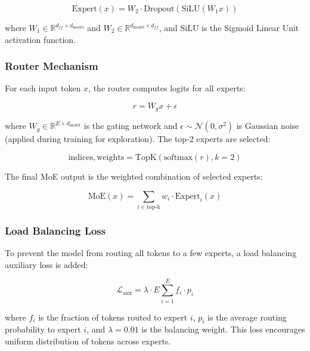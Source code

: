 \documentclass[11pt,a4paper]{article}
\begin{document}
\begin{equation}
\text{Expert}(x) = W_2 \cdot \text{Dropout}(\text{SiLU}(W_1 x))
\end{equation}

where $W_1 \in \mathbb{R}^{d_{ff} \times d_{\text{model}}}$ and $W_2 \in \mathbb{R}^{d_{\text{model}} \times d_{ff}}$, and SiLU is the Sigmoid Linear Unit activation function.

\subsubsection{Router Mechanism}

For each input token $x$, the router computes logits for all experts:

\begin{equation}
r = W_g x + \epsilon
\end{equation}

where $W_g \in \mathbb{R}^{E \times d_{\text{model}}}$ is the gating network and $\epsilon \sim \mathcal{N}(0, \sigma^2)$ is Gaussian noise (applied during training for exploration). The top-2 experts are selected:

\begin{equation}
\text{indices}, \text{weights} = \text{TopK}(\text{softmax}(r), k=2)
\end{equation}

The final MoE output is the weighted combination of selected experts:

\begin{equation}
\text{MoE}(x) = \sum_{i \in \text{top-k}} w_i \cdot \text{Expert}_i(x)
\end{equation}

\subsubsection{Load Balancing Loss}

To prevent the model from routing all tokens to a few experts, a load balancing auxiliary loss is added:

\begin{equation}
\mathcal{L}_{\text{aux}} = \lambda \cdot E \sum_{i=1}^{E} f_i \cdot p_i
\end{equation}

where $f_i$ is the fraction of tokens routed to expert $i$, $p_i$ is the average routing probability to expert $i$, and $\lambda = 0.01$ is the balancing weight. This loss encourages uniform distribution of tokens across experts.
\end{document}
